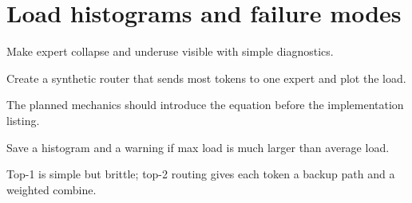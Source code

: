 \section{Load histograms and failure modes}
\label{sec:ch04-load-histograms-and-failure-modes}

Make expert collapse and underuse visible with simple diagnostics.



Create a synthetic router that sends most tokens to one expert and plot the load.



The planned mechanics should introduce the equation before the implementation listing.





\begin{checkpointbox}
Save a histogram and a warning if max load is much larger than average load.
\end{checkpointbox}

Top-1 is simple but brittle; top-2 routing gives each token a backup path and a weighted combine.
